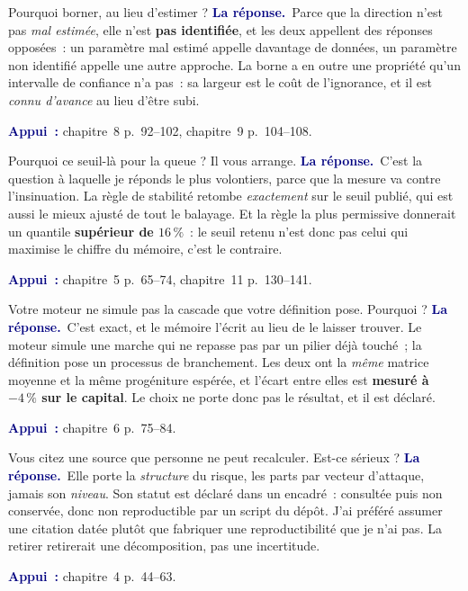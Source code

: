 \documentclass[11pt,a4paper]{article}
\newcommand{\rep}[1]{\smallskip\noindent\textcolor{navy}{\textbf{La réponse.}}\ #1\par}
\newcommand{\appui}[1]{\smallskip\noindent\small\textcolor{navy}{\textbf{Appui~:}} #1\par\normalsize}
\begin{document}
\begin{question}{\og Pourquoi borner, au lieu d'estimer ?\fg{}}
\rep{Parce que la direction n'est pas \emph{mal estimée}, elle n'est \textbf{pas identifiée}, et
les deux appellent des réponses opposées~: un paramètre mal estimé appelle davantage de données,
un paramètre non identifié appelle une autre approche. La borne a en outre une propriété qu'un
intervalle de confiance n'a pas~: sa largeur est le coût de l'ignorance, et il est \emph{connu
d'avance} au lieu d'être subi.}
\appui{chapitre~8 p.~92--102, chapitre~9 p.~104--108.}
\end{question}

\begin{question}{\og Pourquoi ce seuil-là pour la queue ? Il vous arrange.\fg{}}
\rep{C'est la question à laquelle je réponds le plus volontiers, parce que la mesure va contre
l'insinuation. La règle de stabilité retombe \emph{exactement} sur le seuil publié, qui est aussi
le mieux ajusté de tout le balayage. Et la règle la plus permissive donnerait un quantile
\textbf{supérieur de $16\,\%$}~: le seuil retenu n'est donc pas celui qui maximise le chiffre du
mémoire, c'est le contraire.}
\appui{chapitre~5 p.~65--74, chapitre~11 p.~130--141.}
\end{question}

\begin{question}{\og Votre moteur ne simule pas la cascade que votre définition pose. Pourquoi ?\fg{}}
\rep{C'est exact, et le mémoire l'écrit au lieu de le laisser trouver. Le moteur simule une marche
qui ne repasse pas par un pilier déjà touché~; la définition pose un processus de branchement. Les
deux ont la \emph{même} matrice moyenne et la même progéniture espérée, et l'écart entre elles est
\textbf{mesuré à $-4\,\%$ sur le capital}. Le choix ne porte donc pas le résultat, et il est
déclaré.}
\appui{chapitre~6 p.~75--84.}
\end{question}

\begin{question}{\og Vous citez une source que personne ne peut recalculer. Est-ce sérieux ?\fg{}}
\rep{Elle porte la \emph{structure} du risque, les parts par vecteur d'attaque, jamais son
\emph{niveau}. Son statut est déclaré dans un encadré~: consultée puis non conservée, donc non
reproductible par un script du dépôt. J'ai préféré assumer une citation datée plutôt que
fabriquer une reproductibilité que je n'ai pas. La retirer retirerait une décomposition, pas une
incertitude.}
\appui{chapitre~4 p.~44--63.}
\end{question}
\end{document}
